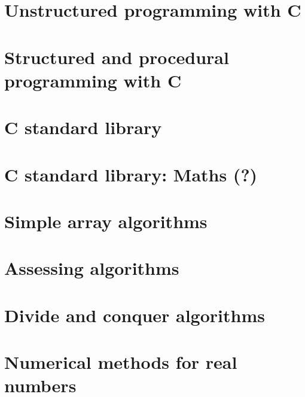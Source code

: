 \documentclass[oneside]{book}
\begin{document}


\part{Unstructured programming with C}











\part{Structured and procedural programming with C}






\part{C standard library}

\part{C standard library: Maths (?)}




\part{Simple array algorithms}






\part{Assessing algorithms}



\part{Divide and conquer algorithms}


\part{Numerical methods for real numbers}






\end{document}
